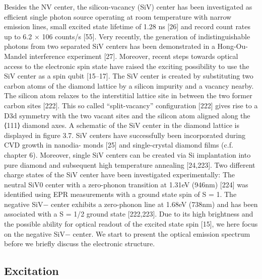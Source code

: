   Besides the NV center, the silicon-vacancy (SiV) center has been investigated as efficient single photon source operating at room temperature with narrow emission lines, small excited state lifetime of 1.28 ns [26] and record count rates up to 6.2 × 106 counts/s [55]. Very recently, the generation of indistinguishable photons from two separated SiV centers has been demonstrated in a Hong-Ou-Mandel interference experiment [27]. Moreover, recent steps towards optical access to the electronic spin state have raised the exciting possibility to use the SiV center as a spin qubit [15–17].
  The SiV center is created by substituting two carbon atoms of the diamond lattice by a silicon impurity and a vacancy nearby. The silicon atom relaxes to the interstitial lattice site in between the two former carbon sites [222]. This so called “split-vacancy” configuration [222] gives rise to a D3d symmetry with the two vacant sites and the silicon atom aligned along the ⟨111⟩ diamond axes. A schematic of the SiV center in the diamond lattice is displayed in figure 3.7.
  SiV centers have successfully been incorporated during CVD growth in nanodia- monds [25] and single-crystal diamond films (c.f. chapter 6). Moreover, single SiV centers can be created via Si implantation into pure diamond and subsequent high temperature annealing [24,223].
  Two different charge states of the SiV center have been investigated experimentally:
  The neutral SiV0 center with a zero-phonon transition at 1.31eV (946nm) [224] was identified using EPR measurements with a ground state spin of S = 1. The negative SiV− center exhibits a zero-phonon line at 1.68eV (738nm) and has been associated with a S = 1/2 ground state [222,223]. Due to its high brightness and the possible ability for optical readout of the excited state spin [15], we here focus on the negative SiV− center. We start to present the optical emission spectrum before we briefly discuss the electronic structure.


    \subsection{Excitation}

